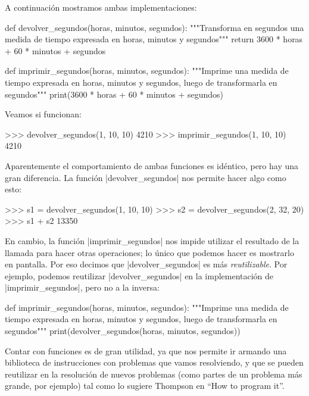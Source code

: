 A continuación mostramos ambas implementaciones:

\begin{codigo-python-sn}
def devolver_segundos(horas, minutos, segundos):
    """Transforma en segundos una medida de tiempo expresada en
       horas, minutos y segundos"""
    return 3600 * horas + 60 * minutos + segundos

def imprimir_segundos(horas, minutos, segundos):
    """Imprime una medida de tiempo expresada en horas, minutos y
       segundos, luego de transformarla en segundos"""
    print(3600 * horas + 60 * minutos + segundos)
\end{codigo-python-sn}

Veamos si funcionan:

\begin{codigo-python-sn}
>>> devolver_segundos(1, 10, 10)
4210
>>> imprimir_segundos(1, 10, 10)
4210
\end{codigo-python-sn}

Aparentemente el comportamiento de ambas funciones es idéntico, pero hay una
gran diferencia. La función |devolver_segundos| nos permite hacer algo como
esto:

\begin{codigo-python-sn}
>>> s1 = devolver_segundos(1, 10, 10)
>>> s2 = devolver_segundos(2, 32, 20)
>>> s1 + s2
13350
\end{codigo-python-sn}

En cambio, la función |imprimir_segundos| nos impide utilizar el resultado de
la llamada para hacer otras operaciones; lo único que podemos hacer es
mostrarlo en pantalla. Por eso decimos que |devolver_segundos| es más
\emph{reutilizable}. Por ejemplo, podemos reutilizar |devolver_segundos| en la
implementación de |imprimir_segundos|, pero no a la inversa:

\begin{codigo-python-sn}
def imprimir_segundos(horas, minutos, segundos):
    """Imprime una medida de tiempo expresada en horas, minutos y
       segundos, luego de transformarla en segundos"""
    print(devolver_segundos(horas, minutos, segundos))
\end{codigo-python-sn}

Contar con funciones es de gran utilidad, ya que nos permite ir armando una
biblioteca de instrucciones con problemas que vamos resolviendo, y que se
pueden reutilizar en la resolución de nuevos problemas (como partes de un
problema más grande, por ejemplo) tal como lo sugiere Thompson en ``How to
program it''.

